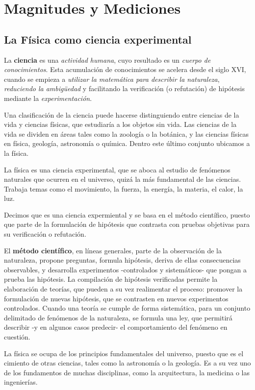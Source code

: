 \section{Magnitudes y Mediciones}

\subsection{La Física como ciencia experimental}

La \textbf{ciencia} es una \textit{actividad humana},
cuyo resultado es un \textit{cuerpo de conocimientos}.
Esta acumulación de conocimientos se acelera desde el siglo XVI,
cuando se empieza a \textit{utilizar la matemática para describir la naturaleza},
\textit{reduciendo la ambigüedad}
y facilitando la verificación (o refutación) de hipótesis
mediante la \textit{experimentación}.

Una clasificación de la ciencia puede hacerse distinguiendo
entre ciencias de la vida y ciencias físicas,
que estudiaría a los objetos sin vida.
Las ciencias de la vida se dividen en áreas tales como la zoología o la botánica,
y las ciencias físicas en física, geología, astronomía o química.
Dentro este último conjunto ubicamos a la física.

La física es una ciencia experimental,
que se aboca al estudio de fenómenos naturales que ocurren en el universo,
quizá la más fundamental de las ciencias.
Trabaja temas como el movimiento,
la fuerza, la energía, la materia, el calor, la luz.

Decimos que es una ciencia expermiental y se basa en el método científico,
puesto que parte de la formulación de hipótesis
que contrasta con pruebas objetivas para su verificación o refutación.

El \textbf{método científico}, en líneas generales,
parte de la observación de la naturaleza,
propone preguntas,
formula hipótesis,
deriva de ellas consecuencias observables,
y desarrolla experimentos -controlados y sistemáticos-
que pongan a prueba las hipótesis.
La compilación de hipótesis verificadas permite la elaboración de teorías,
que pueden a su vez realimentar el proceso:
promover la formulación de nuevas hipótesis,
que se contrasten en nuevos experimentos controlados.
Cuando una teoría se cumple de forma sistemática,
para un conjunto delimitado de fenómenos de la naturaleza,
se formula una ley,
que permitirá describir -y en algunos casos predecir-
el comportamiento del fenómeno en cuestión.

La física se ocupa de los principios fundamentales del universo,
puesto que es el cimiento de otras ciencias,
tales como la astronomía o la geología.
Es a su vez uno de los fundamentos de muchas disciplinas,
como la arquitectura, la medicina o las ingenierías.

